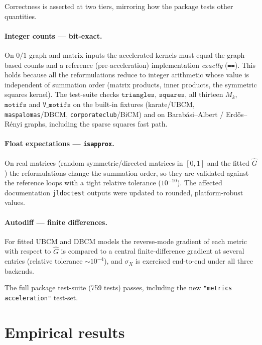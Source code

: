 \documentclass[11pt]{article}
\theoremstyle{plain}
\theoremstyle{definition}
\newcommand{\Ghat}{\hat{G}}
\begin{document}
Correctness is asserted at two tiers, mirroring how the package tests other quantities.

\paragraph{Integer counts --- bit-exact.} On $0/1$ graph and matrix inputs the accelerated kernels must equal
the graph-based counts and a reference (pre-acceleration) implementation \emph{exactly} (\texttt{==}). This
holds because all the reformulations reduce to integer arithmetic whose value is independent of summation
order (matrix products, inner products, the symmetric squares kernel). The test-suite checks
$\texttt{triangles}$, $\texttt{squares}$, all thirteen $M_k$, $\texttt{motifs}$ and $\texttt{V\_motifs}$ on the
built-in fixtures (karate/UBCM, \texttt{maspalomas}/DBCM, \texttt{corporateclub}/BiCM) and on
Barab\'asi--Albert / Erd\H{o}s--R\'enyi graphs, including the sparse squares fast path.

\paragraph{Float expectations --- \texttt{isapprox}.} On real matrices (random symmetric/directed matrices in
$[0,1]$ and the fitted $\Ghat$) the reformulations change the summation order, so they are validated against
the reference loops with a tight relative tolerance ($10^{-10}$). The affected documentation
\texttt{jldoctest} outputs were updated to rounded, platform-robust values.

\paragraph{Autodiff --- finite differences.} For fitted UBCM and DBCM models the reverse-mode gradient of
each metric with respect to $\Ghat$ is compared to a central finite-difference gradient at several entries
(relative tolerance $\sim10^{-4}$), and $\sigma_X$ is exercised end-to-end under all three backends.

The full package test-suite (759 tests) passes, including the new
\texttt{"metrics acceleration"} test-set.

\section{Empirical results}
\label{sec:empirical}
\end{document}
